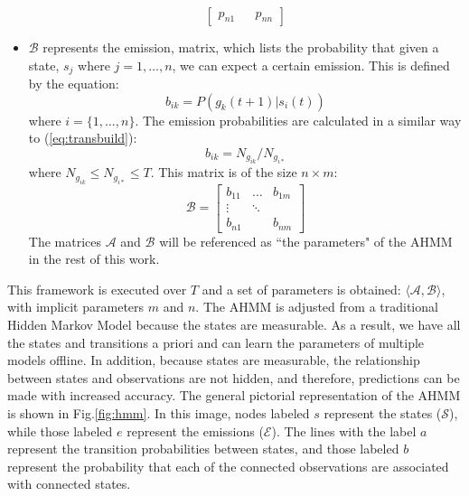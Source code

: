 \documentclass[conference]{IEEEtran}
\begin{document}
\begin{itemize}
\begin{equation}
\begin{bmatrix}
                        p_{n1} &    & p_{nn}
                    \end{bmatrix}
        \end{equation}
    \item $\mathcal{B}$ represents the emission, matrix, which lists the probability that given a state, $s_j$ where $j = 1,\ldots,n$, we can expect a certain emission. This is defined by the equation:
        \begin{equation} \label{eq:obsref}
            b_{ik} = P(g_k(t+1) \vert s_i(t))
        \end{equation}
        where $i = \{1,\ldots,n\}$. The emission probabilities are calculated in a similar way to (\ref{eq:transbuild}):
        \begin{equation} \label{eq:obsbuild}
            b_{ik} = N_{g_{ik}}/N_{g_{i*}}
        \end{equation} 
        where $N_{g_{ik}} \leq N_{g_{i*}} \leq T$. This matrix is of the size $n\times m$:
        \begin{equation}
            \mathcal{B} = 
                    \begin{bmatrix}
                        b_{11} & \dots & b_{1m} \\
                        \vdots & \ddots & \\
                        b_{n1} &    & b_{nm}
                    \end{bmatrix}
        \end{equation}
        The matrices $\mathcal{A}$ and $\mathcal{B}$ will be referenced as ``the parameters" of the AHMM in the rest of this work. 
\end{itemize}

This framework is executed over $T$ and a set of parameters is obtained: $\langle \mathcal{A}, \mathcal{B} \rangle$, with implicit parameters $m$ and $n$. The AHMM is adjusted from a traditional Hidden Markov Model because the states are measurable. As a result, we have all the states and transitions a priori and can learn the parameters of multiple models offline. In addition, because states are measurable, the relationship between states and observations are not hidden, and therefore, predictions can be made with increased accuracy.
The general pictorial representation of the AHMM is shown in Fig.\ref{fig:hmm}. In this image, nodes labeled $s$ represent the states ($\mathcal{S}$), while those labeled $e$ represent the emissions ($\mathcal{E}$). The lines with the label $a$ represent the transition probabilities between states, and those labeled $b$ represent the probability that each of the connected observations are associated with connected states.
\end{document}
